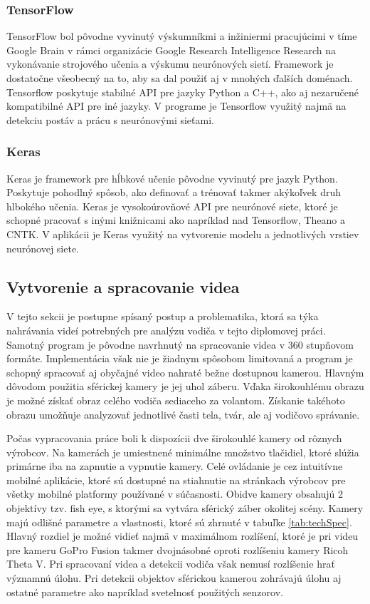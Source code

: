 \documentclass[slovak,master,dept460,male,cpp,cpdeclaration]{diploma}
\begin{document}
\subsubsection*{TensorFlow}
TensorFlow\cite{tensorflow2015-whitepaper} bol pôvodne vyvinutý výskumníkmi a inžiniermi pracujúcimi v tíme Google Brain v rámci organizácie Google Research Intelligence Research na vykonávanie strojového učenia a výskumu neurónových sietí. Framework je dostatočne všeobecný na to, aby sa dal použiť aj v mnohých ďalších doménach. Tensorflow poskytuje stabilné API  pre jazyky Python a C++, ako aj nezaručené kompatibilné API pre iné jazyky. V programe je Tensorflow využitý najmä na detekciu postáv a prácu s neurónovými sieťami.

\subsubsection*{Keras}
Keras\cite{chollet2015keras} je framework pre hĺbkové učenie pôvodne vyvinutý pre jazyk Python. Poskytuje pohodlný spôsob, ako definovať a trénovať takmer akýkoľvek druh hlbokého učenia. Keras je vysokoúrovňové API pre neurónové siete, ktoré je schopné pracovať s inými knižnicami ako napríklad nad Tensorflow, Theano\cite{theano} a CNTK. V aplikácii je Keras využitý na vytvorenie modelu a jednotlivých vrstiev neurónovej siete.

\subsection{Vytvorenie a spracovanie videa}
V tejto sekcii je postupne spísaný postup a problematika, ktorá sa týka nahrávania videí potrebných pre analýzu vodiča v tejto diplomovej práci. Samotný program je pôvodne navrhnutý na spracovanie videa v 360 stupňovom formáte. Implementácia však nie je žiadnym spôsobom limitovaná a program je schopný spracovať aj obyčajné video nahraté bežne dostupnou kamerou. Hlavným dôvodom použitia  sférickej kamery je jej uhol záberu. Vďaka širokouhlému obrazu je možné získať obraz celého vodiča sediaceho za volantom. Získanie takéhoto obrazu umožňuje analyzovať jednotlivé časti tela, tvár, ale aj vodičovo správanie.\par
 Počas vypracovania práce boli k dispozícii dve širokouhlé kamery od rôznych výrobcov. Na kamerách je umiestnené minimálne množstvo tlačidiel, ktoré slúžia primárne iba na zapnutie a vypnutie kamery. Celé ovládanie je cez intuitívne mobilné aplikácie, ktoré sú dostupné na stiahnutie na stránkach výrobcov pre všetky mobilné platformy používané v súčasnosti. Obidve kamery obsahujú 2 objektívy tzv. fish eye, s ktorými sa vytvára sférický záber okolitej scény. Kamery majú odlišné parametre a vlastnosti, ktoré sú zhrnuté v tabuľke \ref{tab:techSpec}. Hlavný rozdiel je možné vidieť najmä v maximálnom rozlíšení, ktoré je pri videu pre kameru GoPro Fusion takmer dvojnásobné oproti rozlíšeniu kamery Ricoh Theta V. Pri spracovaní videa a detekcii vodiča však nemusí rozlíšenie hrať významnú úlohu. Pri detekcii objektov sférickou kamerou zohrávajú úlohu aj ostatné parametre ako napríklad svetelnosť použitých senzorov.
\end{document}
